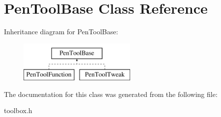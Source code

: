\hypertarget{class_pen_tool_base}{\section{Pen\-Tool\-Base Class Reference}
\label{class_pen_tool_base}
}
Inheritance diagram for Pen\-Tool\-Base\-:\begin{figure}[H]
\begin{center}
\leavevmode
\includegraphics[height=2.000000cm]{class_pen_tool_base}
\end{center}
\end{figure}


The documentation for this class was generated from the following file\-:\begin{DoxyCompactItemize}
\item 
toolbox.\-h\end{DoxyCompactItemize}
